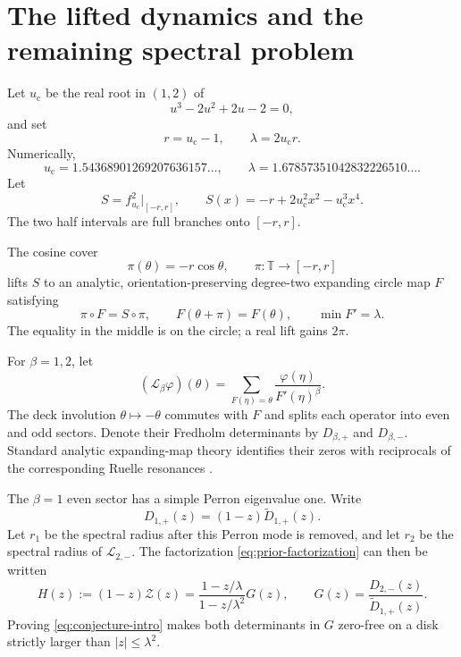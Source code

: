 \documentclass[11pt]{article}
\theoremstyle{definition}
\theoremstyle{remark}
\newcommand{\T}{\mathbb T}
\newcommand{\uc}{u_{\mathrm c}}
\newcommand{\cL}{\mathcal L}
\newcommand{\cZ}{\mathcal Z}
\begin{document}
\section{The lifted dynamics and the remaining spectral problem}
\label{sec:background}

Let $\uc$ be the real root in $(1,2)$ of
\begin{equation}\label{eq:cubic}
 u^3-2u^2+2u-2=0,
\end{equation}
and set
\begin{equation}\label{eq:constants}
 r=\uc-1,
 \qquad
 \lambda=2\uc r.
\end{equation}
Numerically,
\begin{equation}\label{eq:constants-numerical}
 \uc=1.54368901269207636157\ldots,
 \qquad
 \lambda=1.67857351042832226510\ldots.
\end{equation}
Let
\begin{equation}\label{eq:S}
 S=f_{\uc}^2|_{[-r,r]},
 \qquad
 S(x)=-r+2\uc^2x^2-\uc^3x^4.
\end{equation}
The two half intervals are full branches onto $[-r,r]$.

The cosine cover
\begin{equation}\label{eq:cover}
 \pi(\theta)=-r\cos\theta,
 \qquad
 \pi:\T\to[-r,r]
\end{equation}
lifts $S$ to an analytic, orientation-preserving degree-two expanding circle
map $F$ satisfying
\begin{equation}\label{eq:semiconjugacy}
 \pi\circ F=S\circ\pi,
 \qquad
 F(\theta+\pi)=F(\theta),
 \qquad
 \min F'=\lambda.
\end{equation}
The equality in the middle is on the circle; a real lift gains $2\pi$.

For $\beta=1,2$, let
\begin{equation}\label{eq:circle-transfer}
 (\cL_\beta\varphi)(\theta)
 =\sum_{F(\eta)=\theta}\frac{\varphi(\eta)}{F'(\eta)^\beta}.
\end{equation}
The deck involution $\theta\mapsto-\theta$ commutes with $F$ and splits each
operator into even and odd sectors.  Denote their Fredholm determinants by
$D_{\beta,+}$ and $D_{\beta,-}$.  Standard analytic expanding-map theory
identifies their zeros with reciprocals of the corresponding Ruelle
resonances \citep{Ruelle1976,Baladi2000,Baladi2018}.

The $\beta=1$ even sector has a simple Perron eigenvalue one.  Write
\begin{equation}\label{eq:perron-removal}
 D_{1,+}(z)=(1-z)\widetilde D_{1,+}(z).
\end{equation}
Let $r_1$ be the spectral radius after this Perron mode is removed, and let
$r_2$ be the spectral radius of $\cL_{2,-}$.  The factorization
\eqref{eq:prior-factorization} can then be written
\begin{equation}\label{eq:centered-factorization}
 H(z):=(1-z)\cZ(z)
 =\frac{1-z/\lambda}{1-z/\lambda^2}G(z),
 \qquad
 G(z)=\frac{D_{2,-}(z)}{\widetilde D_{1,+}(z)}.
\end{equation}
Proving \eqref{eq:conjecture-intro} makes both determinants in $G$ zero-free
on a disk strictly larger than $|z|\le\lambda^2$.
\end{document}
